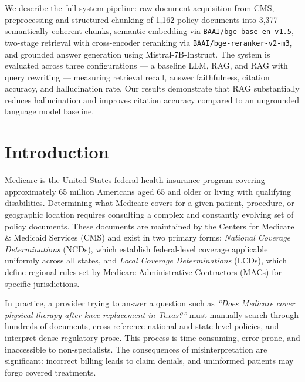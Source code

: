 \documentclass[12pt, letterpaper]{article}
\begin{document}
We describe the full system pipeline: raw document acquisition from CMS, preprocessing and
structured chunking of 1,162 policy documents into 3,377 semantically coherent chunks,
semantic embedding via \texttt{BAAI/bge-base-en-v1.5}, two-stage retrieval with cross-encoder
reranking via \texttt{BAAI/bge-reranker-v2-m3}, and grounded answer generation using
Mistral-7B-Instruct. The system is evaluated across three configurations --- a baseline LLM,
RAG, and RAG with query rewriting --- measuring retrieval recall, answer faithfulness,
citation accuracy, and hallucination rate. Our results demonstrate that RAG substantially
reduces hallucination and improves citation accuracy compared to an ungrounded language
model baseline.

\vspace{1cm}

\newpage


\tableofcontents

\newpage

\section{Introduction}

Medicare is the United States federal health insurance program covering approximately
65 million Americans aged 65 and older or living with qualifying disabilities. Determining
what Medicare covers for a given patient, procedure, or geographic location requires
consulting a complex and constantly evolving set of policy documents. These documents
are maintained by the Centers for Medicare \& Medicaid Services (CMS) and exist in two
primary forms: \textit{National Coverage Determinations} (NCDs), which establish
federal-level coverage applicable uniformly across all states, and \textit{Local Coverage
Determinations} (LCDs), which define regional rules set by Medicare Administrative
Contractors (MACs) for specific jurisdictions.

In practice, a provider trying to answer a question such as \textit{``Does Medicare cover
physical therapy after knee replacement in Texas?''} must manually search through
hundreds of documents, cross-reference national and state-level policies, and interpret
dense regulatory prose. This process is time-consuming, error-prone, and inaccessible
to non-specialists. The consequences of misinterpretation are significant: incorrect
billing leads to claim denials, and uninformed patients may forgo covered treatments.
\end{document}
